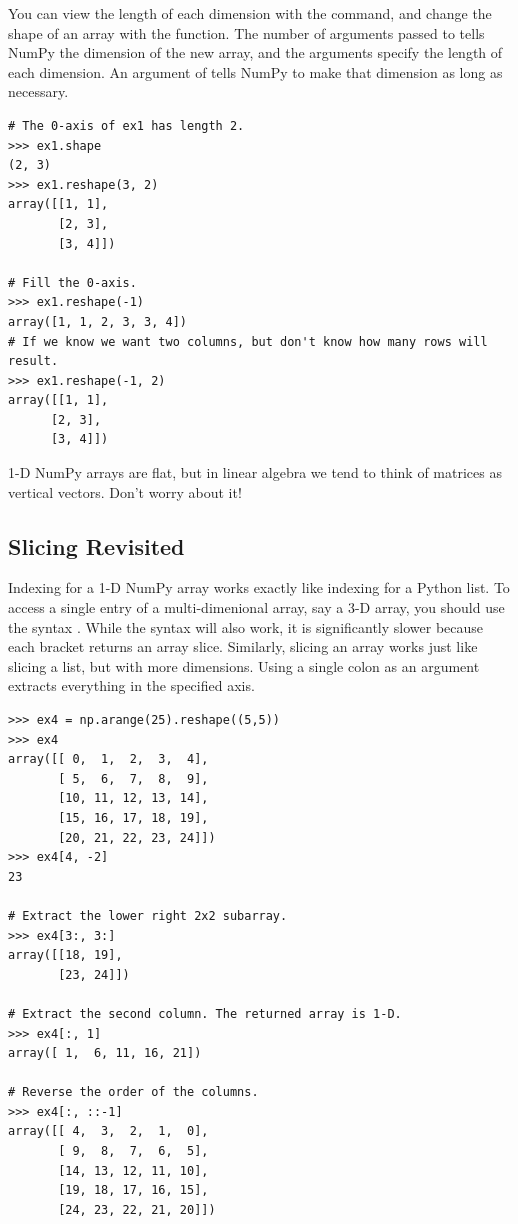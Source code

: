 You can view the length of each dimension with the  command, and change the shape of an array with the  function. 
The number of arguments passed to  tells NumPy the dimension of the new array, and the arguments specify the length of each dimension. 
An argument of  tells NumPy to make that dimension as long as necessary.
\begin{lstlisting}
# The 0-axis of ex1 has length 2.
>>> ex1.shape
(2, 3)
>>> ex1.reshape(3, 2)
array([[1, 1],
       [2, 3],
       [3, 4]])

# Fill the 0-axis.
>>> ex1.reshape(-1)
array([1, 1, 2, 3, 3, 4])
# If we know we want two columns, but don't know how many rows will result.
>>> ex1.reshape(-1, 2)
array([[1, 1],
      [2, 3],
      [3, 4]])
\end{lstlisting}

\begin{info}
1-D NumPy arrays are flat, but in linear algebra we tend to think of matrices as vertical vectors.
Don't worry about it!
\end{info}

\subsection*{Slicing Revisited} 
Indexing for a 1-D NumPy array works exactly like indexing for a Python list. 
To access a single entry of a multi-dimenional array, say a 3-D array, you should use the syntax . 
While the syntax  will also work, it is significantly slower because each bracket returns an array slice. 
Similarly, slicing an array works just like slicing a list, but with more dimensions. Using a single colon as an argument extracts everything in the specified axis.
\begin{lstlisting}
>>> ex4 = np.arange(25).reshape((5,5)) 
>>> ex4
array([[ 0,  1,  2,  3,  4],
       [ 5,  6,  7,  8,  9],
       [10, 11, 12, 13, 14],
       [15, 16, 17, 18, 19],
       [20, 21, 22, 23, 24]])
>>> ex4[4, -2]
23

# Extract the lower right 2x2 subarray.
>>> ex4[3:, 3:] 
array([[18, 19],
       [23, 24]])
       
# Extract the second column. The returned array is 1-D.
>>> ex4[:, 1] 
array([ 1,  6, 11, 16, 21]) 

# Reverse the order of the columns.
>>> ex4[:, ::-1] 
array([[ 4,  3,  2,  1,  0],
       [ 9,  8,  7,  6,  5],
       [14, 13, 12, 11, 10],
       [19, 18, 17, 16, 15],
       [24, 23, 22, 21, 20]])
\end{lstlisting}

